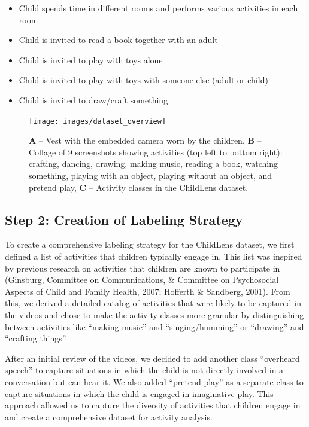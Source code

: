 \documentclass[
  man,floatsintext]{apa6}
\providecommand{\tightlist}{%
  \setlength{\itemsep}{0pt}\setlength{\parskip}{0pt}}
\begin{document}
\begin{itemize}
\tightlist
\item
  Child spends time in different rooms and performs various activities in each room
\item
  Child is invited to read a book together with an adult
\item
  Child is invited to play with toys alone
\item
  Child is invited to play with toys with someone else (adult or child)
\item
  Child is invited to draw/craft something
\end{itemize}

\begin{figure}

{\centering \texttt{[image: images/dataset\_overview]} 

}

\caption{\textbf{A} – Vest with the embedded camera worn by the children, \textbf{B} – Collage of 9 screenshots showing activities (top left to bottom right): crafting, dancing, drawing, making music, reading a book, watching something, playing with an object, playing without an object, and pretend play, \textbf{C} – Activity classes in the ChildLens dataset.}\label{fig:camera-superannotate-activity-classes}
\end{figure}

\subsection{Step 2: Creation of Labeling Strategy}\label{step-2-creation-of-labeling-strategy}

To create a comprehensive labeling strategy for the ChildLens dataset, we first defined a list of activities that children typically engage in. This list was inspired by previous research on activities that children are known to participate in (Ginsburg, Committee on Communications, \& Committee on Psychosocial Aspects of Child and Family Health, 2007; Hofferth \& Sandberg, 2001). From this, we derived a detailed catalog of activities that were likely to be captured in the videos and chose to make the activity classes more granular by distinguishing between activities like ``making music'' and ``singing/humming'' or ``drawing'' and ``crafting things''.

After an initial review of the videos, we decided to add another class ``overheard speech'' to capture situations in which the child is not directly involved in a conversation but can hear it. We also added ``pretend play'' as a separate class to capture situations in which the child is engaged in imaginative play. This approach allowed us to capture the diversity of activities that children engage in and create a comprehensive dataset for activity analysis.
\end{document}
